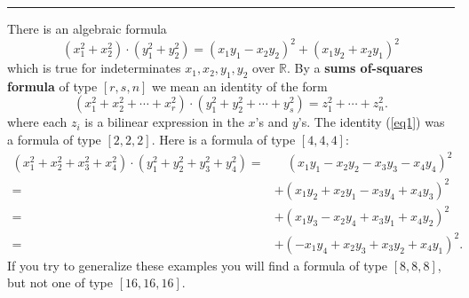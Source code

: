 \documentclass[letterpaper, 12pt]{article}
\begin{document}
\noindent\rule{7in}{2.8pt}
There is an algebraic formula 
\begin{equation}\label{eq1}
    (x_1^2+x_2^2)\cdot (y_1^2+y_2^2)=(x_1y_1-x_2y_2)^2+(x_1y_2+x_2y_1)^2
\end{equation}
which is true for indeterminates \(x_1,x_2,y_1,y_2\) over \(\mathbb{R}\). By a \textbf{sums of-squares formula} of type \([r,s,n]\) we mean an identity of the form 
\[(x_1^2+x_2^2+\cdots+x_r^2)\cdot (y_1^2+y_2^2+\cdots+y_s^2)=z_1^2+\cdots+z_n^2.\]
where each \(z_i\) is a bilinear expression in the \(x\)'s and \(y\)'s. The identity (\ref{eq1}) was a formula of type \([2,2,2]\). Here is a formula of type \([4,4,4]\):
\begin{align*}
    (x_1^2+x_2^2+x_3^2+x_4^2)\cdot (y_1^2+y_2^2+y_3^2+y_4^2)=&\quad (x_1y_1-x_2y_2-x_3y_3-x_4y_4)^2\\ 
                                                            =&+(x_1y_2+x_2y_1-x_3y_4+x_4y_3)^2\\ 
                                                            =&+(x_1y_3-x_2y_4+x_3y_1+x_4y_2)^2\\ 
                                                            =&+(-x_1y_4+x_2y_3+x_3y_2+x_4y_1)^2.
\end{align*}
If you try to generalize these examples you will find a formula of type \([8,8,8]\), but not one of type \([16,16,16]\).
\end{document}
